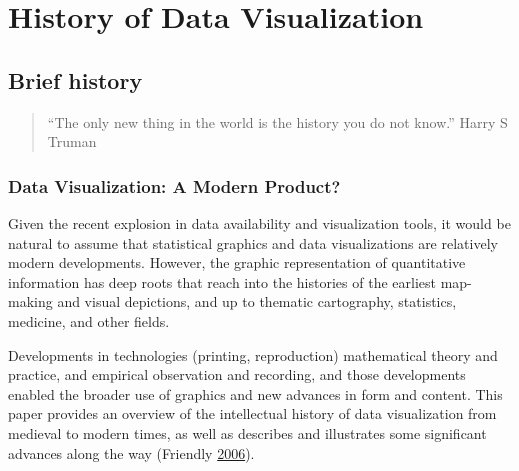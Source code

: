 \documentclass[]{book}
\begin{document}
\section{History of Data
Visualization}\label{history-of-data-visualization}

\subsection{Brief history}\label{brief-history}

\begin{quote}
``The only new thing in the world is the history you do not know.''
Harry S Truman
\end{quote}

\subsubsection{Data Visualization: A Modern
Product?}\label{data-visualization-a-modern-product}

Given the recent explosion in data availability and visualization tools,
it would be natural to assume that statistical graphics and data
visualizations are relatively modern developments. However, the graphic
representation of quantitative information has deep roots that reach
into the histories of the earliest map-making and visual depictions, and
up to thematic cartography, statistics, medicine, and other fields.

Developments in technologies (printing, reproduction) mathematical
theory and practice, and empirical observation and recording, and those
developments enabled the broader use of graphics and new advances in
form and content. This paper provides an overview of the intellectual
history of data visualization from medieval to modern times, as well as
describes and illustrates some significant advances along the way
(Friendly \protect\hyperlink{ref-data_viz_history}{2006}).
\end{document}

